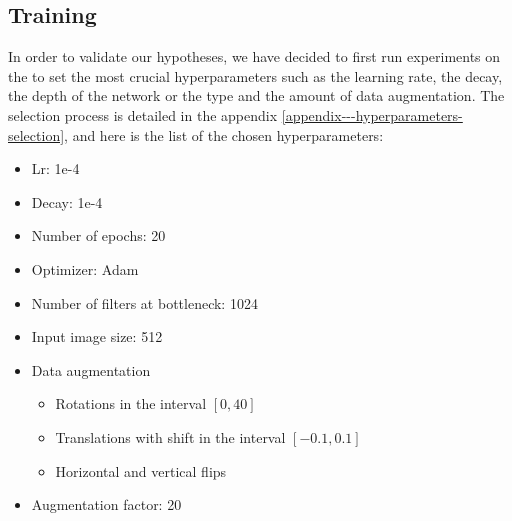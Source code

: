 \subsection{Training}\label{sem-seg-training}

In order to validate our hypotheses, we have decided to first run
experiments on the  to set the most crucial hyperparameters
such as the learning rate, the decay, the depth of the network or the
type and the amount of data augmentation.
The selection process is detailed in the appendix \ref{appendix---hyperparameters-selection}, and here is the list of the chosen hyperparameters:


\begin{itemize}[itemsep=-0.5em]
	\item Lr: 1e-4
	\item Decay: 1e-4
	\item Number of epochs: 20
	\item Optimizer: Adam
	\item Number of filters at bottleneck: 1024
	\item Input image size: 512
	\item Data augmentation
	\vspace{-1em}
	\begin{itemize}[itemsep=-0.5em]
		\item Rotations in the interval $ \left[0, 40\right] $
		\item Translations with shift in the interval $ \left[-0.1, 0.1\right] $
		\item Horizontal and vertical flips
	\end{itemize}
	\vspace{-0.5em}
	\item Augmentation factor: 20
\end{itemize}


